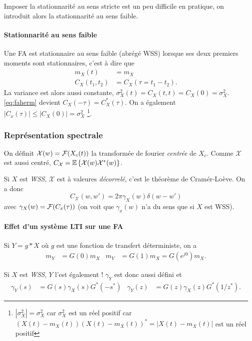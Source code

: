 Imposer la stationnarité au sens stricte est un peu difficile en pratique,
on introduit alors la stationnarité au sens faible.

\paragraph{Stationnarité au sens faible}
Une FA est stationnaire au sens faible (abrégé WSS) lorsque
ses deux premiers moments sont stationnaires,
c'est à dire que
\begin{align*}
  m_X(t)       & = m_X\\
  C_X(t_1,t_2) & = C_X(\tau = t_1 - t_2). %
\end{align*}
La variance est alors aussi constante,
$\sigma_X^2(t) = C_X(t,t) = C_X(0) = \sigma_X^2$.
\eqref{eq:faherm} devient $C_X(-\tau) = C_X^*(\tau)$.
On a également $|C_x(\tau)| \leq |C_X(0)| = \sigma_X^2$
\footnote{$|\sigma_X^2| = \sigma_X^2$ car $\sigma_X^2$ est un réel positif car
$(X(t)-m_X(t))(X(t)-m_X(t))^* = |X(t)-m_X(t)|$ est un réel positif}.

\subsubsection{Représentation spectrale}
On définit $\mathcal{X}(w) = \mathcal{F}(X_c(t))$ la transformée de fourier
\emph{centrée} de $X_c$.
Comme $\mathcal{X}$ est aussi centré,
$C_\mathcal{X} = \mathbb{E}\left\{\mathcal{X}(w)\mathcal{X}^*(w)\right\}$.

Si $X$ est \emph{WSS}, $\mathcal{X}$ est à valeures \emph{décorrelé},
c'est le théorème de Cramér-Loève. On a donc
\[
  C_\mathcal{X}(w,w') = 2\pi \gamma_X(w) \delta(w - w')
\]
avec $\gamma_X(w) = \mathcal{F}(C_x(\tau))$
(on voit que $\gamma_x(w)$ n'a du sens que si $X$ est WSS).

\paragraph{Effet d'un système LTI sur une FA}
Si $Y = g * X$ où $g$ est une fonction de transfert déterministe,
on a
\begin{align*}
  m_Y & = G(0) m_X & m_Y & = G(1) m_X = G(e^{j0}) m_X.
\end{align*}

Si $X$ est \emph{WSS}, $Y$ l'est également !
$\gamma_Y$ est donc aussi défini et%
\begin{align*}
  \gamma_Y(s) & = G(s)\gamma_X(s)G^*(-s^*) & \gamma_Y(z) & = G(z) \gamma_X(z) G^*(1/z^*).
\end{align*}

